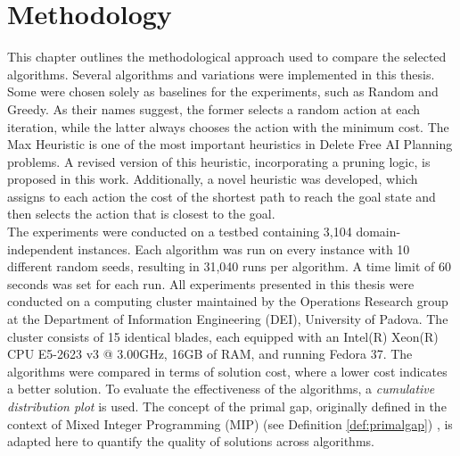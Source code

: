 \chapter{Methodology}
\label{ch:methodology}
This chapter outlines the methodological approach used to compare the selected algorithms.
Several algorithms and variations were implemented in this thesis. Some
were chosen solely as baselines for the experiments, such as Random and Greedy.
As their names suggest, the former selects a random action at each iteration, while the latter
always chooses the action with the minimum cost.
The Max Heuristic \cite{bonet2001planning} is one of the most important
heuristics in Delete Free AI Planning problems. A revised version of this heuristic, incorporating
a pruning logic, is proposed in this work.
Additionally, a novel heuristic was developed, which assigns to each action the cost of the shortest path to reach the goal
state and then selects the action that is closest to the goal.\\
The experiments were conducted on a testbed containing 3,104 domain-independent instances.
Each algorithm was run on every instance with 10 different random seeds, resulting in 31,040 runs
per algorithm. A time limit of 60 seconds was set for each run.
All experiments presented in this thesis were conducted on a computing cluster maintained by the Operations Research group at the
Department of Information Engineering (DEI), University of Padova.
The cluster consists of 15 identical blades, each equipped with an Intel(R) Xeon(R) CPU E5-2623 v3 @ 3.00GHz, 16GB of RAM, and running Fedora 37.
The algorithms were compared in terms of solution cost, where a lower cost indicates a better solution.
To evaluate the effectiveness of the algorithms, a \textit{cumulative distribution plot} is used.
The concept of the primal gap, originally defined in the context of Mixed Integer Programming (MIP)
(see Definition \ref{def:primalgap}) \cite{berthold2013measuring}, is adapted here to quantify the quality of solutions across algorithms.

